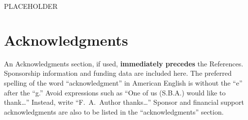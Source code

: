 \documentclass[conf]{new-aiaa}
\begin{document}
PLACEHOLDER

\section*{Acknowledgments}
An Acknowledgments section, if used, \textbf{immediately precedes} the References. Sponsorship information and funding data are included here. The preferred spelling of the word ``acknowledgment'' in American English is without the ``e'' after the ``g.'' Avoid expressions such as ``One of us (S.B.A.) would like to thank\ldots'' Instead, write ``F.~A.~Author thanks\ldots'' Sponsor and financial support acknowledgments are also to be listed in the ``acknowledgments'' section.


\end{document}
